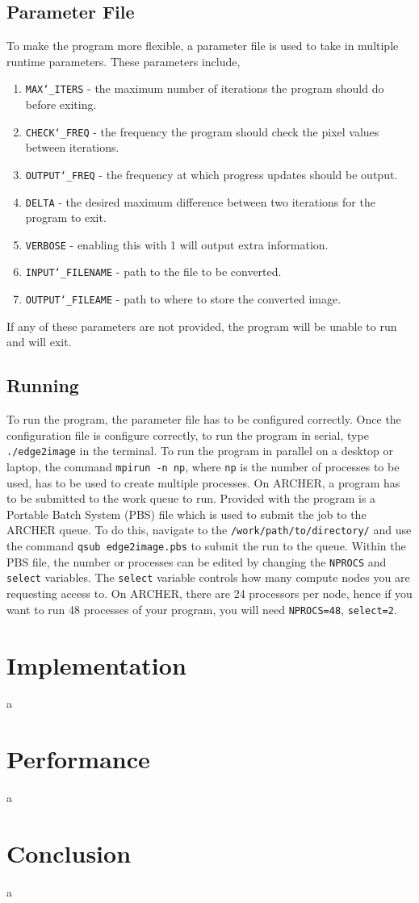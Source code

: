 \documentclass[11pt, a4paper]{article}
\begin{document}
		\subsection{Parameter File}
			To make the program more flexible, a parameter file is used to take in multiple runtime parameters. These parameters include,
				
				\begin{enumerate}
					\item \texttt{MAX\char`_ITERS} - the maximum number of iterations the program should do before exiting.
					\item \texttt{CHECK\char`_FREQ} - the frequency the program should check the pixel values between iterations.
					\item \texttt{OUTPUT\char`_FREQ} - the frequency at which progress updates should be output.
					\item \texttt{DELTA} - the desired maximum difference between two iterations for the program to exit.
					\item \texttt{VERBOSE} - enabling this with 1 will output extra information.
					\item \texttt{INPUT\char`_FILENAME} - path to the file to be converted.
					\item \texttt{OUTPUT\char`_FILEAME} - path to where to store the converted image.
				\end{enumerate}
			
			\noindent If any of these parameters are  not provided, the program will be unable to run and will exit. 
	
		\subsection{Running}
			To run the program, the parameter file has to be configured correctly. Once the configuration file is configure correctly, to run the program in serial, type \texttt{./edge2image} in the terminal. To run the program in parallel on a desktop or laptop, the command \texttt{mpirun -n np}, where \texttt{np} is the number of processes to be used, has to be used to create multiple processes. On ARCHER, a program has to be submitted to the work queue to run. Provided with the program is a Portable Batch System (PBS) file which is used to submit the job to the ARCHER queue. To do this, navigate to the \texttt{/work/path/to/directory/} and use the command \texttt{qsub edge2image.pbs} to submit the run to the queue. Within the PBS file, the number or processes can be edited by changing the \texttt{NPROCS} and \texttt{select} variables. The \texttt{select} variable controls how many compute nodes you are requesting access to. On ARCHER, there are 24 processors per node, hence if you want to run 48 processes of your program, you will need \texttt{NPROCS=48}, \texttt{select=2}.
			
	
	\section{Implementation}
		a
		
	\section{Performance}
		a
	
	\section{Conclusion}
		a
		
\end{document}
